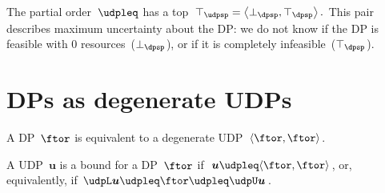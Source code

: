 The partial order~$\udpleq$ has a top~$\top_{\udpsp}=\left\langle \bot_{\dpsp},\top_{\dpsp}\right\rangle .$
This pair describes maximum uncertainty about the DP: we do not know
if the DP is feasible with 0 resources~($\bot_{\dpsp}$), or if it
is completely infeasible~($\top_{\dpsp}$).


\section{DPs as degenerate UDPs}

A DP~$\ftor$ is equivalent to a degenerate UDP~$\langle\ftor,\ftor\rangle$.

A UDP~$\boldsymbol{u}$ is a bound for a DP~$\ftor$ if~$\boldsymbol{u}\udpleq\langle\ftor,\ftor\rangle$,
or, equivalently, if $\udpL\boldsymbol{u}\udpleq\ftor\udpleq\udpU\boldsymbol{u}$.


